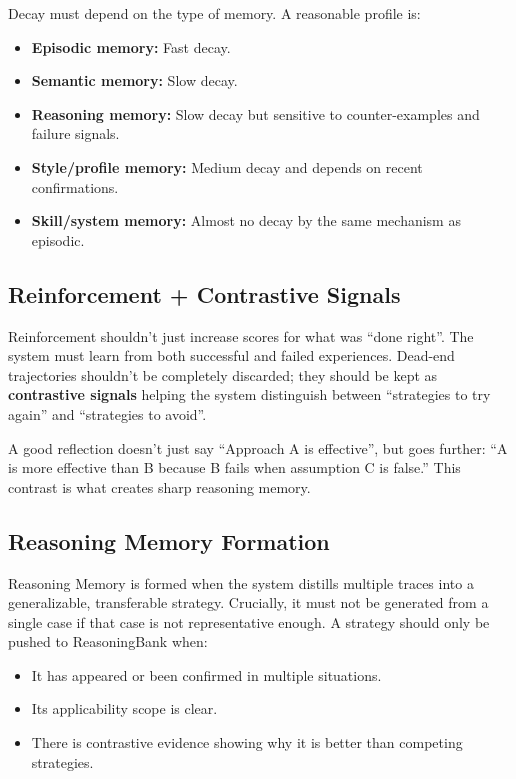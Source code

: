 \documentclass[a4paper,12pt]{article}
\begin{document}
Decay must depend on the type of memory. A reasonable profile is:
\begin{itemize}
    \item \textbf{Episodic memory:} Fast decay.
    \item \textbf{Semantic memory:} Slow decay.
    \item \textbf{Reasoning memory:} Slow decay but sensitive to counter-examples and failure signals.
    \item \textbf{Style/profile memory:} Medium decay and depends on recent confirmations.
    \item \textbf{Skill/system memory:} Almost no decay by the same mechanism as episodic.
\end{itemize}

\subsection*{Reinforcement + Contrastive Signals}

Reinforcement shouldn't just increase scores for what was ``done right''. The system must learn from both successful and failed experiences. Dead-end trajectories shouldn't be completely discarded; they should be kept as \textbf{contrastive signals} helping the system distinguish between ``strategies to try again'' and ``strategies to avoid''.

A good reflection doesn't just say ``Approach A is effective'', but goes further: ``A is more effective than B because B fails when assumption C is false.'' This contrast is what creates sharp reasoning memory.

\subsection*{Reasoning Memory Formation}

Reasoning Memory is formed when the system distills multiple traces into a generalizable, transferable strategy. Crucially, it must not be generated from a single case if that case is not representative enough. A strategy should only be pushed to ReasoningBank when:
\begin{itemize}
    \item It has appeared or been confirmed in multiple situations.
    \item Its applicability scope is clear.
    \item There is contrastive evidence showing why it is better than competing strategies.
\end{itemize}
\end{document}
